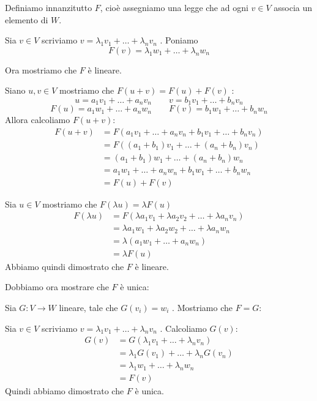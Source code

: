 \documentclass[
  a4paper,
]{article}
\begin{document}
\begin{proofbox}
Definiamo innanzitutto \(F\), cioè assegniamo una legge che ad ogni
\(v \in V\) associa un elemento di \(W\).

Sia \(v \in V\) scriviamo \(v = \lambda_1 v_1 + \dots + \lambda_n v_n\)
. Poniamo \[
F(v) = \lambda_1 w_1 + \dots + \lambda_n w_n
\]

Ora mostriamo che \(F\) è lineare.

Siano \(u, v \in V\) mostriamo che \(F(u + v) = F(u) + F(v)\) : \[
u = a_1 v_1 + \dots + a_n v_n \qquad v = b_1 v_1 + \dots + b_n v_n
\] \[
F(u) = a_1 w_1 + \dots + a_n w_n \qquad F(v) = b_1 w_1 + \dots + b_n w_n
\] Allora calcoliamo \(F(u + v)\): \[
\begin{aligned}
F(u + v) &= F(a_1 v_1 + \dots + a_n v_n + b_1 v_1 + \dots + b_n v_n) \\
&= F((a_1 + b_1) v_1 + \dots + (a_n + b_n) v_n) \\
&= (a_1 + b_1) w_1 + \dots + (a_n + b_n) w_n \\
&= a_1 w_1 + \dots + a_n w_n + b_1 w_1 + \dots + b_n w_n \\
&= F(u) + F(v)
\end{aligned}
\]

Sia \(u\in V\) mostriamo che \(F(\lambda u) = \lambda F(u)\) \[
\begin{aligned}
F(\lambda u) &= F(\lambda a_1 v_1 + \lambda a_2 v_2 + \dots + \lambda a_n v_n ) \\
&= \lambda a_1 w_1 + \lambda a_2 w_2 + \dots + \lambda a_n w_n \\
&= \lambda (a_1 w_1 + \dots + a_n w_n) \\
&= \lambda F(u)
\end{aligned}
\] Abbiamo quindi dimostrato che \(F\) è lineare.

Dobbiamo ora mostrare che \(F\) è unica:

Sia \(G: V \to W\) lineare, tale che \(G(v_i) = w_i\) . Mostriamo che
\(F = G\):

Sia \(v \in V\) scriviamo \(v = \lambda_1 v_1 + \dots + \lambda_n v_n\)
. Calcoliamo \(G(v)\): \[
\begin{aligned}
G(v) &= G(\lambda_1 v_1 + \dots + \lambda_n v_n) \\
&= \lambda_1 G(v_1) + \dots + \lambda_n G(v_n)\\
&= \lambda_1 w_1 + \dots + \lambda_n w_n \\
&= F(v)
\end{aligned}
\] Quindi abbiamo dimostrato che \(F\) è unica.
\end{proofbox}
\end{document}
